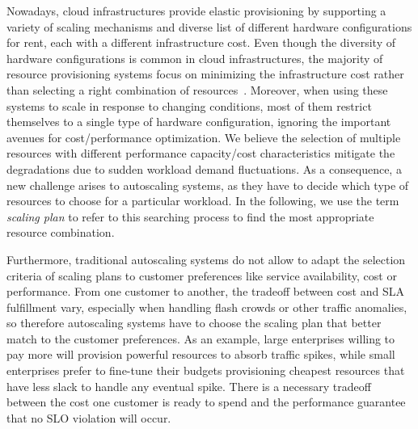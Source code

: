 Nowadays, cloud infrastructures provide elastic provisioning by supporting a variety of scaling mechanisms and diverse list of different hardware configurations for rent, each with a different infrastructure cost. Even though the diversity of hardware configurations is common in cloud infrastructures, the majority of resource provisioning systems focus on minimizing the infrastructure cost rather than selecting a right combination of resources~\cite{herbst_2013,urgaonkar_agile_2008,dejavu2012}. Moreover, when using these systems to scale in response to changing conditions, most of them restrict themselves to a single type of hardware configuration, ignoring the important avenues for cost/performance optimization. We believe the selection of multiple resources with different performance capacity/cost characteristics mitigate the degradations due to sudden workload demand fluctuations. As a consequence, a new challenge arises to autoscaling systems, as they have to decide which type of resources to choose for a particular workload. In the following, we use the term \emph{scaling plan} to refer to this searching process to find the most appropriate resource combination. 


Furthermore, traditional autoscaling systems do not allow to adapt the selection criteria of scaling plans to customer preferences like service availability, cost or performance. From one customer to another, the tradeoff between cost and SLA fulfillment vary, especially when handling flash crowds or other traffic anomalies, so therefore autoscaling systems have to choose the scaling plan that better match to the customer preferences. As an example, large enterprises willing to pay more will provision powerful resources to absorb traffic spikes, while small enterprises prefer to fine-tune their budgets provisioning cheapest resources that have less slack to handle any eventual spike. There is a necessary tradeoff between the cost one customer is ready to spend and the performance guarantee that no SLO violation will occur.



